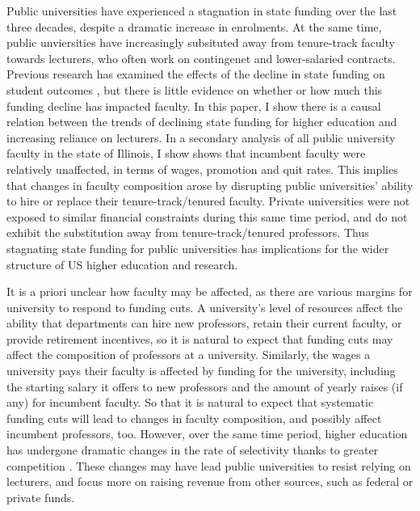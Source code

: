 Public universities have experienced a stagnation in state funding over the last three decades, despite a dramatic increase in enrolments.
At the same time, public unviersities have increasingly subsituted away from tenure-track faculty towards lecturers, who often work on contingenet and lower-salaried contracts.
Previous research has examined the effects of the decline in state funding on student outcomes \citep{NBERw23736,NBERw27885}, but there is little evidence on whether or how much this funding decline has impacted faculty.
In this paper, I show there is a causal relation between the trends of declining state funding for higher education and increasing reliance on lecturers.
In a secondary analysis of all public university faculty in the state of Illinois, I show  shows that incumbent faculty were relatively unaffected, in terms of wages, promotion and quit rates.
This implies that changes in faculty composition arose by disrupting public universities' ability to hire or replace their tenure-track/tenured faculty. 
Private universities were not exposed to similar financial constraints during this same time period, and do not exhibit the substitution away from tenure-track/tenured professors.
Thus stagnating state funding for public universities has implications for the wider structure of US higher education and research.

It is a priori unclear how faculty may be affected, as there are various margins for university to respond to funding cuts.
A university's level of resources affect the ability that departments can hire new professors, retain their current faculty, or provide retirement incentives, so it is natural to expect that funding cuts may affect the composition of professors at a university.
Similarly, the wages a university pays their faculty is affected by funding for the university, including the starting salary it offers to new professors and the amount of yearly raises (if any) for incumbent faculty.
So that it is natural to expect that systematic funding cuts will lead to changes in faculty composition, and possibly affect incumbent professors, too.
However, over the same time period, higher education has undergone dramatic changes in the rate of selectivity thanks to greater competition \citep{hoxby2009changing}.
These changes may have lead public universities to resist relying on lecturers, and focus more on raising revenue from other sources, such as federal or private funds.

